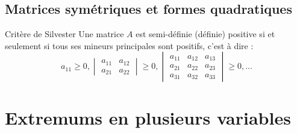 \section{Matrices symétriques et formes quadratiques}
\begin{bclogo}[couleur=green!30,couleurBord=green,logo=\bccle ,ombre=true,arrondi=0.1]{Critère de Silvester}
Une matrice $A$ est semi-définie (définie) positive si et seulement si tous ses mineurs principales sont positifs, c'est à  dire :
$$a_{11}\ge 0, \begin{vmatrix} a_{11}&a_{12}\\ a_{21} & a_{22}\end{vmatrix}\ge 0,\begin{vmatrix}a_{11} & a_{12} & a_{13}\\ a_{21} & a_{22} & a_{23}\\ a_{31} & a_{32} & a_{33}\end{vmatrix}\ge 0, ...$$
\end{bclogo}
\chapter{Extremums en plusieurs variables}